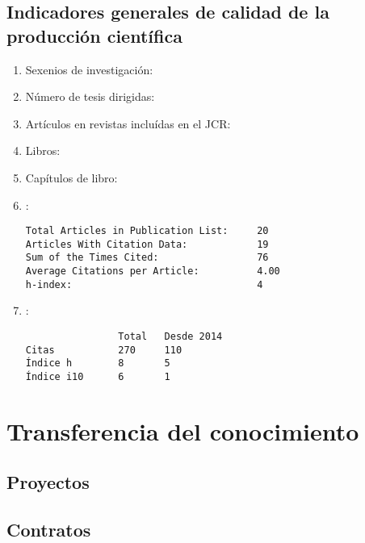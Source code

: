 \documentclass[a4paper]{article}
\begin{document}
\subsection{Indicadores generales de calidad de la producción científica}

\begin{enumerate}
\item Sexenios de investigación: 
\item Número de tesis dirigidas: 
\item Artículos en revistas incluídas en el JCR: 
\item Libros: 
\item Capítulos de libro: 
\item :
\begin{verbatim}
Total Articles in Publication List:     20
Articles With Citation Data:            19
Sum of the Times Cited:                 76
Average Citations per Article:          4.00
h-index:                                4
\end{verbatim}

\item :
\begin{verbatim}
                Total   Desde 2014
Citas           270     110
Índice h        8       5
Índice i10      6       1
\end{verbatim}
\end{enumerate}

%

\renewcommand{\refname}{}

\section{Transferencia del conocimiento}

\subsection{Proyectos}
\vspace{-5ex}


\subsection{Contratos}
\vspace{-5ex}


\end{document}
